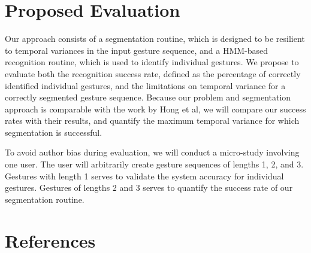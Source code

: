 \documentclass[twoside]{article}
\begin{document}
\begin{multicols}{2}
\section{Proposed Evaluation}

Our approach consists of a segmentation routine, which is designed to be
resilient to temporal variances in the input gesture sequence, and a HMM-based
recognition routine, which is used to identify individual gestures. We propose
to evaluate both the recognition success rate, defined as the percentage of
correctly identified individual gestures, and the limitations on temporal
variance for a correctly segmented gesture sequence. Because our problem and
segmentation approach is comparable with the work by Hong et
al\cite{hong1998segmentation}, we will compare our success rates with their
results, and quantify the maximum temporal variance for which segmentation is
successful.

To avoid author bias during evaluation, we will conduct a micro-study involving
one user. The user will arbitrarily create gesture sequences of
lengths 1, 2, and 3. Gestures with length 1 serves to validate the system
accuracy for individual gestures. Gestures of lengths 2 and 3 serves to quantify
the success rate of our segmentation routine.

\section{References}

\begin{spacing}{0.9}
%
\begingroup
\renewcommand{\section}[2]{}%

\endgroup
\end{spacing}

\end{multicols}
\end{document}
